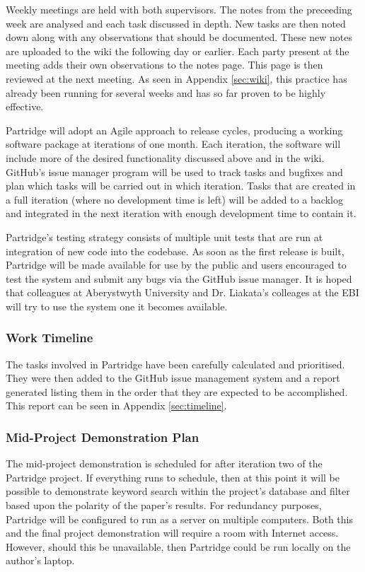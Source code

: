 \documentclass[12pt,a4paper]{article}
\begin{document}
Weekly meetings are held with both supervisors. The notes from the preceeding
week are analysed and each task discussed in depth. New tasks are then noted
down along with any observations that should be documented. These new notes are
uploaded to the wiki the following day or earlier. Each party present at the
meeting adds their own observations to the notes page. This page is then
reviewed at the next meeting. As seen in Appendix \ref{sec:wiki}, this practice
has already been running for several weeks and has so far proven to be highly
effective.

Partridge will adopt an Agile approach to release cycles, producing a working
software package at iterations of one month.  Each iteration, the software will
include more of the desired functionality discussed above and in the wiki.
GitHub's issue manager program will be used to track tasks and bugfixes and
plan which tasks will be carried out in which iteration. Tasks that are created
in a full iteration (where no development time is left) will be added to a
backlog and integrated in the next iteration with enough development time to
contain it.

Partridge's testing strategy consists of multiple unit tests that are run at
integration of new code into the codebase. As soon as the first release is
built, Partridge will be made available for use by the public and users
encouraged to test the system and submit any bugs via the GitHub issue manager.
It is hoped that colleagues at Aberystwyth University and Dr. Liakata's
colleages at the EBI will try to use the system one it becomes available.

\subsubsection{ Work Timeline }

The tasks involved in Partridge have been carefully calculated and prioritised.
They were then added to the GitHub issue management system and a report
generated listing them in the order that they are expected to be
accomplished. This report can be seen in Appendix \ref{sec:timeline}. 


\subsubsection{ Mid-Project Demonstration Plan}

The mid-project demonstration is scheduled for after iteration two of the
Partridge project. If everything runs to schedule, then at this point it will
be possible to demonstrate keyword search within the project's database and
filter based upon the polarity of the paper's results. For redundancy purposes,
Partridge will be configured to run as a server on multiple computers. Both
this and the final project demonstration will require a room with Internet
access. However, should this be unavailable, then Partridge could be run
locally on the author's laptop.
\end{document}
